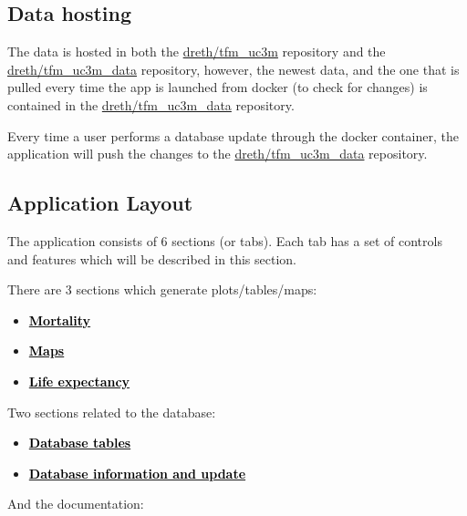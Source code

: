\documentclass[
  a4paper]{article}
\begin{document}
\hypertarget{data-hosting}{%
\subsection{Data hosting}\label{data-hosting}}

The data is hosted in both the
\href{https://github.com/dreth/tfm_uc3m}{dreth/tfm\_uc3m} repository and
the \href{https://github.com/dreth/tfm_uc3m_data}{dreth/tfm\_uc3m\_data}
repository, however, the newest data, and the one that is pulled every
time the app is launched from docker (to check for changes) is contained
in the
\href{https://github.com/dreth/tfm_uc3m_data}{dreth/tfm\_uc3m\_data}
repository.

Every time a user performs a database update through the docker
container, the application will push the changes to the
\href{https://github.com/dreth/tfm_uc3m_data}{dreth/tfm\_uc3m\_data}
repository.

\hypertarget{application-layout}{%
\subsection{Application Layout}\label{application-layout}}

The application consists of 6 sections (or tabs). Each tab has a set of
controls and features which will be described in this section.

There are 3 sections which generate plots/tables/maps:

\begin{itemize}
\item
  \protect\hyperlink{MortalityLayout}{\textcolor{black}{\textbf{Mortality}}}
\item
  \protect\hyperlink{MapsLayout}{\textcolor{black}{\textbf{Maps}}}
\item
  \protect\hyperlink{LifeExpLayout}{\textcolor{black}{\textbf{Life
  expectancy}}}
\end{itemize}

Two sections related to the database:

\begin{itemize}
\item
  \protect\hyperlink{DBTablesLayout}{\textcolor{black}{\textbf{Database
  tables}}}
\item
  \protect\hyperlink{DBInfoLayout}{\textcolor{black}{\textbf{Database
  information and update}}}
\end{itemize}

And the documentation:
\end{document}
